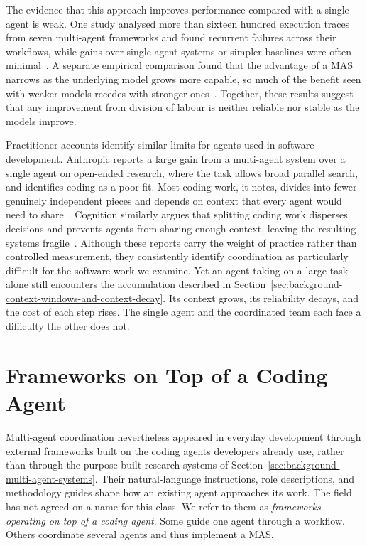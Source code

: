 The evidence that this approach improves performance compared with a single agent is weak. One study analysed more than sixteen hundred execution traces from seven multi-agent frameworks and found recurrent failures across their workflows, while gains over single-agent systems or simpler baselines were often minimal~\cite{cemri2025masfail}. A separate empirical comparison found that the advantage of a MAS narrows as the underlying model grows more capable, so much of the benefit seen with weaker models recedes with stronger ones~\cite{gao2025singlemulti}. Together, these results suggest that any improvement from division of labour is neither reliable nor stable as the models improve.

Practitioner accounts identify similar limits for agents used in software development. Anthropic reports a large gain from a multi-agent system over a single agent on open-ended research, where the task allows broad parallel search, and identifies coding as a poor fit. Most coding work, it notes, divides into fewer genuinely independent pieces and depends on context that every agent would need to share~\cite{hadfield2025multiagent}. Cognition similarly argues that splitting coding work disperses decisions and prevents agents from sharing enough context, leaving the resulting systems fragile~\cite{yan2025multiagents}. Although these reports carry the weight of practice rather than controlled measurement, they consistently identify coordination as particularly difficult for the software work we examine. Yet an agent taking on a large task alone still encounters the accumulation described in Section~\ref{sec:background-context-windows-and-context-decay}. Its context grows, its reliability decays, and the cost of each step rises. The single agent and the coordinated team each face a difficulty the other does not.

\section{Frameworks on Top of a Coding Agent}
\label{sec:background-frameworks-on-top-of-a-coding-agent}

Multi-agent coordination nevertheless appeared in everyday development through external frameworks built on the coding agents developers already use, rather than through the purpose-built research systems of Section~\ref{sec:background-multi-agent-systems}. Their natural-language instructions, role descriptions, and methodology guides shape how an existing agent approaches its work. The field has not agreed on a name for this class. We refer to them as \emph{frameworks operating on top of a coding agent}. Some guide one agent through a workflow. Others coordinate several agents and thus implement a MAS.

